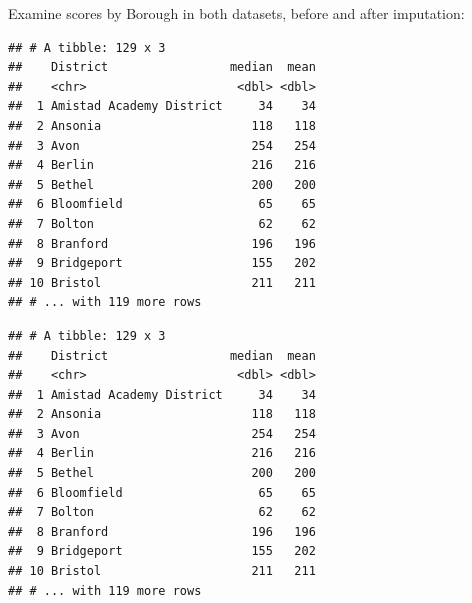 \documentclass[]{book}
\newenvironment{Shaded}{\begin{snugshade}}{\end{snugshade}}
\newcommand{\DataTypeTok}[1]{\textcolor[rgb]{0.13,0.29,0.53}{#1}}
\newcommand{\DecValTok}[1]{\textcolor[rgb]{0.00,0.00,0.81}{#1}}
\newcommand{\KeywordTok}[1]{\textcolor[rgb]{0.13,0.29,0.53}{\textbf{#1}}}
\newcommand{\NormalTok}[1]{#1}
\newcommand{\OperatorTok}[1]{\textcolor[rgb]{0.81,0.36,0.00}{\textbf{#1}}}
\newcommand{\OtherTok}[1]{\textcolor[rgb]{0.56,0.35,0.01}{#1}}
\newcommand{\StringTok}[1]{\textcolor[rgb]{0.31,0.60,0.02}{#1}}
\begin{document}
Examine scores by Borough in both datasets, before and after imputation:

\begin{Shaded}
\end{Shaded}

\begin{verbatim}
## # A tibble: 129 x 3
##    District                 median  mean
##    <chr>                     <dbl> <dbl>
##  1 Amistad Academy District     34    34
##  2 Ansonia                     118   118
##  3 Avon                        254   254
##  4 Berlin                      216   216
##  5 Bethel                      200   200
##  6 Bloomfield                   65    65
##  7 Bolton                       62    62
##  8 Branford                    196   196
##  9 Bridgeport                  155   202
## 10 Bristol                     211   211
## # ... with 119 more rows
\end{verbatim}

\begin{Shaded}
\end{Shaded}

\begin{verbatim}
## # A tibble: 129 x 3
##    District                 median  mean
##    <chr>                     <dbl> <dbl>
##  1 Amistad Academy District     34    34
##  2 Ansonia                     118   118
##  3 Avon                        254   254
##  4 Berlin                      216   216
##  5 Bethel                      200   200
##  6 Bloomfield                   65    65
##  7 Bolton                       62    62
##  8 Branford                    196   196
##  9 Bridgeport                  155   202
## 10 Bristol                     211   211
## # ... with 119 more rows
\end{verbatim}
\end{document}
